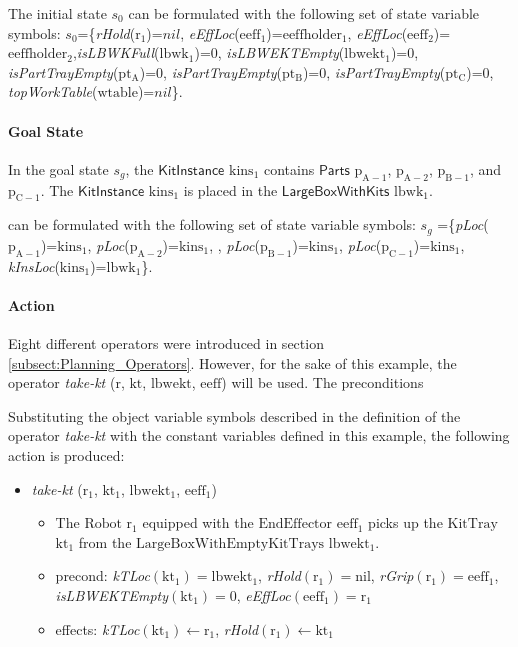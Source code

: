 The initial state $s_0$ can be formulated with the following set of state variable symbols:
$s_0$=\{\emph{rHold}($\mathrm{r_1}$)=$nil$, \emph{eEffLoc}($\mathrm{eeff_1}$)=$\mathrm{eeffholder_1}$, \emph{eEffLoc}($\mathrm{eeff_2}$)=$\mathrm{eeffholder_2}$,\emph{isLBWKFull}($\mathrm{lbwk_1}$)=0, \emph{isLBWEKTEmpty}($\mathrm{lbwekt_1}$)=0, \emph{isPartTrayEmpty}($\mathrm{pt_A}$)=0, \emph{isPartTrayEmpty}($\mathrm{pt_B}$)=0, \emph{isPartTrayEmpty}($\mathrm{pt_C}$)=0, \emph{topWorkTable}($\mathrm{wtable}$)=$nil$\}.

\paragraph{Goal State}
In the goal state $s_g$, the $\mathsf{KitInstance}$ $\mathrm{kins_1}$ contains $\mathsf{Parts}$ $\mathrm{p_{A-1}}$, $\mathrm{p_{A-2}}$, $\mathrm{p_{B-1}}$, and $\mathrm{p_{C-1}}$. The $\mathsf{KitInstance}$ $\mathrm{kins_1}$ is placed in the $\mathsf{LargeBoxWithKits}$ $\mathrm{lbwk_1}$.

can be formulated with the following set of state variable symbols:
$s_g$ =\{\emph{pLoc}($\mathrm{p_{A-1}}$)=$\mathrm{kins_1}$, \emph{pLoc}($\mathrm{p_{A-2}}$)=$\mathrm{kins_1}$, , \emph{pLoc}($\mathrm{p_{B-1}}$)=$\mathrm{kins_1}$, \emph{pLoc}($\mathrm{p_{C-1}}$)=$\mathrm{kins_1}$, \emph{kInsLoc}($\mathrm{kins_1}$)=$\mathrm{lbwk_1}$\}.

\paragraph{Action}
Eight different operators were introduced in section \ref{subsect:Planning_Operators}. However, for the sake of this example, the operator \textsl{take-kt} ($\mathrm{r}$, $\mathrm{kt}$, $\mathrm{lbwekt}$, $\mathrm{eeff}$) will be used. The preconditions

Substituting the object variable symbols described in the definition of the operator \textsl{take-kt} with the constant variables defined in this example, the following action is produced:

\begin{itemize}
\item \textsl{take-kt} ($\mathrm{r_1}$, $\mathrm{kt_1}$, $\mathrm{lbwekt_1}$, $\mathrm{eeff_1}$)
\begin{itemize}
\item The $\mathrm{Robot}$ $\mathrm{r_1}$ equipped with the $\mathrm{EndEffector}$ $\mathrm{eeff_1}$ picks up the $\mathrm{KitTray}$ $\mathrm{kt_1}$ from the $\mathrm{LargeBoxWithEmptyKitTrays}$ $\mathrm{lbwekt_1}$.
\item precond: \emph{kTLoc}$\mathrm{(kt_1)=lbwekt_1}$, \emph{rHold}$\mathrm{(r_1)=nil}$, \emph{rGrip}$\mathrm{(r_1)=eeff_1}$, \emph{isLBWEKTEmpty}$\mathrm{(kt_1)=0}$, \emph{eEffLoc}$\mathrm{(eeff_1)=r_1}$
\item effects: \emph{kTLoc}$\mathrm{(kt_1)\leftarrow r_1}$, \emph{rHold}$\mathrm{(r_1)\leftarrow kt_1}$
\end{itemize}
\end{itemize}




